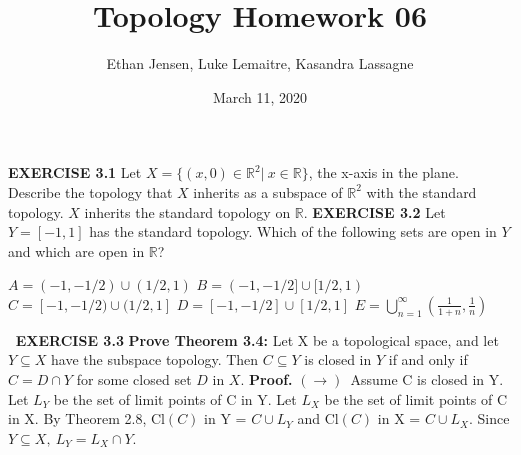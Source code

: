 \documentclass[12pt]{article}
\title{Topology Homework 06}
\author{Ethan Jensen, Luke Lemaitre, Kasandra Lassagne}
\date{March 11, 2020}
\begin{document}
  \maketitle
  \noindent
  \textbf{EXERCISE 3.1}
  Let \(X = \{(x,0)\in \mathbb{R}^2|\ x \in \mathbb{R}\}\), the x-axis in the plane. Describe the topology that \(X\) inherits as a subspace of \(\mathbb{R}^2\) with the standard topology.
  \newline \newline
  \(X\) inherits the standard topology on \(\mathbb{R}\).
  \newpage
  \noindent
  \textbf{EXERCISE 3.2}
  Let \(Y = [-1,1]\) has the standard topology. Which of the following sets are open in \(Y\) and which are open in \(\mathbb{R}\)?
  \begin{adjustwidth}{1cm}{0cm}
    \begin{flushleft}
      \(A = (-1,-1/2) \cup (1/2,1)\) \newline
      \(B = (-1,-1/2] \cup [1/2,1)\) \newline
      \(C = [-1,-1/2) \cup (1/2, 1]\) \newline
      \(D = [-1,-1/2] \cup [1/2,1]\) \newline
      \(E = \bigcup_{n=1}^\infty(\frac{1}{1+n}, \frac{1}{n})\)
    \end{flushleft}
  \end{adjustwidth}
  \(\ \)
  \newline
  \newline
  \newpage
  \noindent
  \textbf{EXERCISE 3.3}
  \textbf{Prove Theorem 3.4:} Let X be a topological space, and let \(Y \subseteq X\) have the subspace topology. Then \(C \subseteq Y\) is closed in \(Y\) if and only if \(C = D \cap Y\) for some closed set \(D\) in \(X\).
  \newline \newline
  \textbf{Proof.}
  \newline
  \((\rightarrow)\)\ Assume C is closed in Y.
  \newline
  Let \(L_Y\) be the set of limit points of C in Y.
  \newline
  Let \(L_X\) be the set of limit points of C in X.
  \newline
  By Theorem 2.8, Cl\((C)\) in Y = \(C \cup L_Y\) and Cl\((C)\) in X = \(C \cup L_X\).
  \newline
  Since \(Y \subseteq X,\ L_Y = L_X \cap Y\).
  \newline \newline
\end{document}
